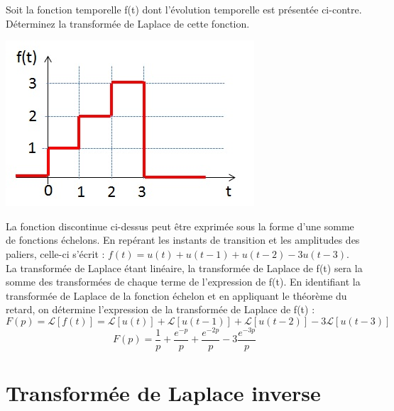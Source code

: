 	\begin{minipage}[l]{0.6\linewidth}
		Soit la fonction temporelle f(t) dont l'évolution temporelle est présentée ci-contre. Déterminez la transformée de Laplace de cette fonction.	
	\end{minipage} \hfill
	\begin{minipage}[r]{0.6\linewidth}
		\includegraphics[scale=0.7]{images/Ex_Laplace_Fonction_marche_escalier.jpg} 	
	\end{minipage}
	\vspace{0.5\baselineskip}
	
	La fonction discontinue ci-dessus peut être exprimée sous la forme d'une somme de fonctions échelons. En repérant les instants de transition et les amplitudes des paliers, celle-ci s'écrit : $f(t)= u(t) + u(t-1) + u(t-2) - 3u(t-3)$.
	La transformée de Laplace étant linéaire, la transformée de Laplace de f(t) sera la somme des transformées de chaque terme de l'expression de f(t). En identifiant la transformée de Laplace de la fonction échelon et en appliquant le théorème du retard, on détermine l'expression de la transformée de Laplace de f(t) :
	\begin{equation*}
	F(p)=\mathcal{L}[f(t)]=\mathcal{L}[u(t)]+\mathcal{L}[u(t-1)]+\mathcal{L}[u(t-2)]-3\mathcal{L}[u(t-3)]
	\end{equation*}
	\begin{equation*}
	F(p)=\frac{1}{p}+\frac{e^{-p}}{p}+\frac{e^{-2p}}{p}-3\frac{e^{-3p}}{p}
	\end{equation*}
	\vspace{1\baselineskip}
		
	
	
	\section{Transformée de Laplace inverse}
	
